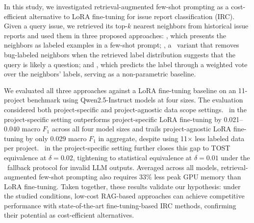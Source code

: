 In this study, we investigated retrieval-augmented few-shot prompting as a cost-efficient alternative to LoRA fine-tuning for issue report classification (IRC). Given a query issue, we retrieved its top-$k$ nearest neighbors from historical issue reports and used them in three proposed approaches: \ragtag, which presents the neighbors as labeled examples in a few-shot prompt; \bragtag, a \ragtag\ variant that removes bug-labeled neighbors when the retrieved label distribution suggests that the query is likely a question; and \votag, which predicts the label through a weighted vote over the neighbors' labels, serving as a non-parametric baseline.

We evaluated all three approaches against a LoRA fine-tuning baseline on an 11-project benchmark using Qwen2.5-Instruct models at four sizes. The evaluation considered both project-specific and project-agnostic data scope settings. \ragtag\ in the project-specific setting outperforms project-specific LoRA fine-tuning by 0.021--0.040 macro $F_1$ across all four model sizes and trails project-agnostic LoRA fine-tuning by only 0.029 macro $F_1$ in aggregate, despite using 11$\times$ less labeled data per project. \bragtag\ in the project-specific setting further closes this gap to TOST equivalence at $\delta{=}0.02$, tightening to statistical equivalence at $\delta{=}0.01$ under the \votag\ fallback protocol for invalid LLM outputs. Averaged across all models, retrieval-augmented few-shot prompting also requires 33\% less peak GPU memory than LoRA fine-tuning. Taken together, these results validate our hypothesis: under the studied conditions, low-cost RAG-based approaches can achieve competitive performance with state-of-the-art fine-tuning-based IRC methods, confirming their potential as cost-efficient alternatives.


